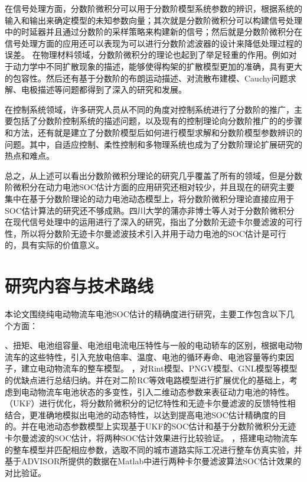 在信号处理方面，分数阶微积分可以用于分数阶模型系统参数的辨识，根据系统的输入和输出来确定模型的未知参数向量；其次就是分数阶微积分可以构建信号处理中的时延器并且通过分数阶的采样策略来构建新的信号；然后就是分数阶微积分在信号处理方面的应用还可以表现为可以进行分数阶滤波器的设计来降低处理过程的误差。
在物理材料领域，分数阶微积分的理论也起到了举足轻重的作用。例如对于动力学中不同扩散现象的描述，能够使得构架的扩散模型更加的准确，具有更大的包容性。然后还有基于分数阶的布朗运动描述、对流散布建模、Cauchy问题求解、电极描述等问题都得到了深入的研究和发展。

在控制系统领域，许多研究人员从不同的角度对控制系统进行了分数阶的推广，主要包括了分数阶控制系统的描述问题，以及现有的控制理论向分数阶推广的的步骤和方法，还有就是建立了分数阶模型后如何进行模型求解和分数阶模型参数辨识的问题。其中，自适应控制、柔性控制和多物理系统也成为了分数阶理论扩展研究的热点和难点。

总之，从上述可以看出分数阶微积分理论的研究几乎覆盖了所有的领域，但是分数阶微积分在动力电池SOC估计方面的应用研究还相对较少，并且现在的研究主要集中在基于分数阶理论的动力电池动态模型上，将分数阶微积分理论直接应用于SOC估计算法的研究还不够成熟。四川大学的蒲亦非博士等人对于分数阶微积分在现代信号处理中的运用进行了深入的研究，指出了分数阶无迹卡尔曼滤波的可行性，所以将分数阶无迹卡尔曼滤波技术引入并用于动力电池的SOC估计是可行的，具有实际的价值意义。
\section{研究内容与技术路线}
本论文围绕纯电动物流车电池SOC估计的精确度进行研究，主要工作包含以下几个方面：
\begin{enumerate}
、扭矩、电池组容量、电池组电流电压特性与一般的电动轿车的区别，根据电动物流车的这些特性，引入充放电倍率、温度、电池的循环寿命、电池容量等约束因子，建立电动物流车的整车模型。
，对Rint模型、PNGV模型、GNL模型等模型的优缺点进行总结归纳。并在对二阶RC等效电路模型进行扩展优化的基础上，考虑到电动物流车电池状态的多变性，引入二维动态参数来表征动力电池的特性。
（UKF）进行优化，将分数阶微积分的记忆特性和无迹卡尔曼滤波的反馈特性相结合，更准确地模拟出电池的动态特性，以达到提高电池SOC估计精确度的目的。并在电池动态参数模型上实现基于UKF的SOC估计和基于分数阶微积分无迹卡尔曼滤波的SOC估计，将两种SOC估计效果进行比较验证。
，搭建电动物流车的整车模型并匹配相应参数，选取不同的城市道路实际工况进行整车仿真实验，并基于ADVISOR所提供的数据在Matlab中进行两种卡尔曼滤波算法SOC估计效果的对比验证。
\end{enumerate}

